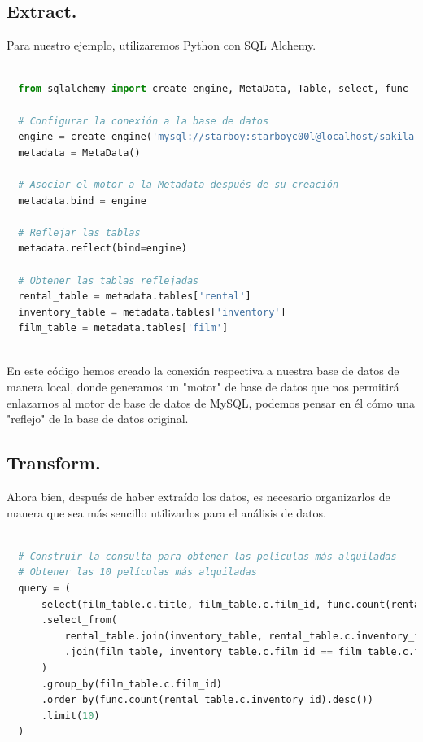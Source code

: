\documentclass[12pt]{article}
\begin{document}
\subsection{Extract.}

Para nuestro ejemplo, utilizaremos Python con SQL Alchemy.

\vspace{12pt}
\begin{lstlisting}[language=Python]
    
  from sqlalchemy import create_engine, MetaData, Table, select, func

  # Configurar la conexión a la base de datos
  engine = create_engine('mysql://starboy:starboyc00l@localhost/sakila')
  metadata = MetaData()
  
  # Asociar el motor a la Metadata después de su creación
  metadata.bind = engine
  
  # Reflejar las tablas
  metadata.reflect(bind=engine)
  
  # Obtener las tablas reflejadas
  rental_table = metadata.tables['rental']
  inventory_table = metadata.tables['inventory']
  film_table = metadata.tables['film']
    
\end{lstlisting}
\vspace{12pt}

En este código hemos creado la conexión respectiva a nuestra base de datos de manera local, donde generamos un "motor" de base de datos que nos permitirá enlazarnos al motor de base de datos de MySQL, podemos pensar en él cómo una "reflejo" de la base de datos original.


\subsection{Transform.}

Ahora bien, después de haber extraído los datos, es necesario organizarlos de manera que sea más sencillo utilizarlos para el análisis de datos.

\vspace{12pt}
\begin{lstlisting}[language=Python]
    
  # Construir la consulta para obtener las películas más alquiladas
  # Obtener las 10 películas más alquiladas
  query = (
      select(film_table.c.title, film_table.c.film_id, func.count(rental_table.c.inventory_id).label('rental_count'))
      .select_from(
          rental_table.join(inventory_table, rental_table.c.inventory_id == inventory_table.c.inventory_id)
          .join(film_table, inventory_table.c.film_id == film_table.c.film_id)
      )
      .group_by(film_table.c.film_id)
      .order_by(func.count(rental_table.c.inventory_id).desc())
      .limit(10)
  )
    
\end{lstlisting}
\vspace{12pt}
\end{document}
